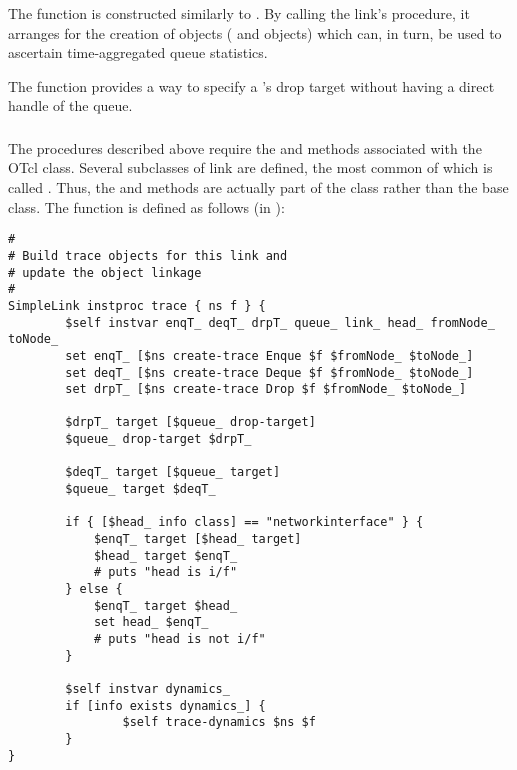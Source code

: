 The  function is constructed similarly to
.
By calling the link's  procedure, it arranges
for the creation of objects ( and 
objects) which can, in turn, be used to ascertain time-aggregated
queue statistics.

The  function provides a way to specify a
's drop target without having a direct handle of
the queue.

\subsubsection{}

The  procedures described above require the 
and  methods associated with the OTcl  class.
Several subclasses of link are defined, the most common of which
is called .  Thus, the  and 
methods are actually part of the  class rather than
the  base class.
The  function is defined as follows (in ):
\begin{small}
\begin{verbatim}
#
# Build trace objects for this link and
# update the object linkage
#
SimpleLink instproc trace { ns f } {
        $self instvar enqT_ deqT_ drpT_ queue_ link_ head_ fromNode_ toNode_
        set enqT_ [$ns create-trace Enque $f $fromNode_ $toNode_]
        set deqT_ [$ns create-trace Deque $f $fromNode_ $toNode_]
        set drpT_ [$ns create-trace Drop $f $fromNode_ $toNode_]

        $drpT_ target [$queue_ drop-target]
        $queue_ drop-target $drpT_

        $deqT_ target [$queue_ target]
        $queue_ target $deqT_

        if { [$head_ info class] == "networkinterface" } {
            $enqT_ target [$head_ target]
            $head_ target $enqT_
            # puts "head is i/f"
        } else {
            $enqT_ target $head_
            set head_ $enqT_
            # puts "head is not i/f"
        }

        $self instvar dynamics_
        if [info exists dynamics_] {
                $self trace-dynamics $ns $f
        }
}

\end{verbatim}
\end{small}

